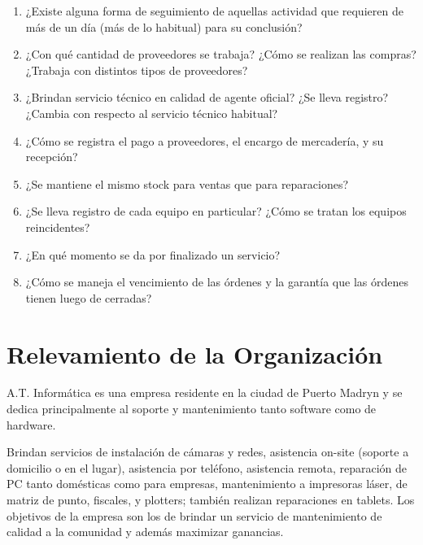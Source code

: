 \documentclass[12pt]{extarticle}
\begin{document}
\begin{spacing}{1.2}
\begin{enumerate}
        \item ¿Existe alguna forma de seguimiento de aquellas actividad que requieren de más de un día (más de lo habitual) para su conclusión?
        \item ¿Con qué cantidad de proveedores se trabaja? ¿Cómo se realizan las compras? ¿Trabaja con distintos tipos de proveedores?
        \item ¿Brindan servicio técnico en calidad de agente oficial? ¿Se lleva registro? ¿Cambia con respecto al servicio técnico habitual?
        \item ¿Cómo se registra el pago a proveedores, el encargo de mercadería, y su recepción?
        \item ¿Se mantiene el mismo stock para ventas que para reparaciones?
        \item ¿Se lleva registro de cada equipo en particular? ¿Cómo se tratan los equipos reincidentes?
        \item ¿En qué momento se da por finalizado un servicio?
        \item ¿Cómo se maneja el vencimiento de las órdenes y la garantía que las órdenes tienen luego de cerradas?
    \end{enumerate}

    \pagebreak









    \section{Relevamiento de la Organización}
    A.T. Informática es una empresa residente en la ciudad de Puerto Madryn y se dedica principalmente al soporte y mantenimiento tanto software como de hardware.

    Brindan servicios de instalación de cámaras y redes, asistencia on-site (soporte a domicilio o en el lugar), asistencia por teléfono, asistencia remota, reparación de PC tanto domésticas como para empresas, mantenimiento a impresoras láser, de matriz de punto, fiscales, y plotters; también realizan reparaciones en tablets.  Los objetivos de la empresa son los de brindar un servicio de mantenimiento de calidad a la comunidad y además maximizar ganancias.\\

    \pagebreak

\end{spacing}
\end{document}

